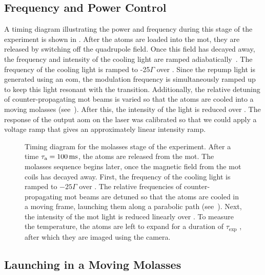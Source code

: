 \subsection{Frequency and Power Control}\label{subsec:molasses_control}
A timing diagram illustrating the power and frequency during this
stage of the experiment is shown in .
After the atoms are loaded into the \ac{mot}, they are released by
switching off the quadrupole field. Once this field has decayed away,
the frequency and intensity of the cooling light are ramped
adiabatically~\cite{Molmer1990}. The frequency of the cooling light is ramped to
-25\(\Gamma\) over . Since the repump
light is generated using an \ac{eom}, the modulation frequency is
simultaneously ramped up to keep this light resonant with the
 transition. Additionally, the relative detuning of
counter-propagating \ac{mot} beams is varied so that the atoms are
cooled into a moving molasses
(see~). After this, the intensity
of the light is reduced over . The response
of the output \ac{aom} on the \Muquans laser was calibrated so that we
could apply a voltage ramp that gives an approximately linear
intensity ramp.
\begin{figure}[!htbp]
    \centering
    \fontsize{14pt}{14pt}
    \resizebox{0.7\textwidth}{!}{}
    \caption[Molasses stage timing diagram]{Timing diagram for the
    molasses stage of the experiment. After a time \(\tau_\text{a} =
  \sivalue{100}{\milli\second}\), the atoms are released from the
\ac{mot}. The molasses sequence begins 
later, once the magnetic field from the \ac{mot} coils has decayed
away. First, the frequency of the cooling light is ramped to \(-25
\Gamma\) over . The relative frequencies
of counter-propagating \ac{mot} beams are detuned so that the atoms
are cooled in a moving frame, launching them along a parabolic path
(see~). Next, the intensity of the
\ac{mot} light is reduced linearly over . To
measure the temperature, the atoms are left to expand for a duration
of \(\tau_\text{exp}\) \sivalue{}{\milli\second}, after which they are
imaged using the camera.}
    \label{fig:molasses_timing}
\end{figure}
\subsection{Launching in a Moving Molasses}\label{subsec:moving_molasses}

